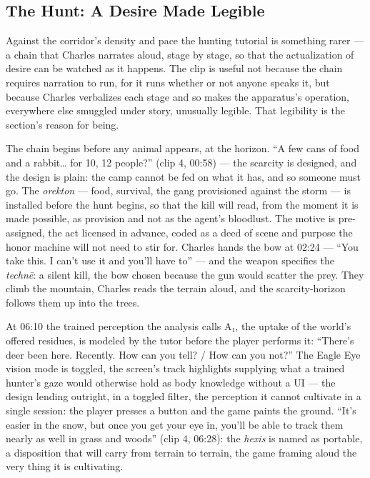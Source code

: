\documentclass{article}
\begin{document}
\bigskip

\subsection*{The Hunt: A Desire Made Legible}

Against the corridor's density and pace the hunting tutorial is something rarer — a chain that Charles narrates aloud, stage by stage, so that the actualization of desire can be watched as it happens. The clip is useful not because the chain requires narration to run, for it runs whether or not anyone speaks it, but because Charles verbalizes each stage and so makes the apparatus's operation, everywhere else smuggled under story, unusually legible. That legibility is the section's reason for being.

The chain begins before any animal appears, at the horizon. ``A few cans of food and a rabbit… for 10, 12 people?'' (clip 4, 00:58) — the scarcity is designed, and the design is plain: the camp cannot be fed on what it has, and so someone must go. The \textit{orekton} — food, survival, the gang provisioned against the storm — is installed before the hunt begins, so that the kill will read, from the moment it is made possible, as provision and not as the agent's bloodlust. The motive is pre-assigned, the act licensed in advance, coded as a deed of scene and purpose the honor machine will not need to stir for. Charles hands the bow at 02:24 — ``You take this. I can't use it and you'll have to'' — and the weapon specifies the \textit{technē}: a silent kill, the bow chosen because the gun would scatter the prey. They climb the mountain, Charles reads the terrain aloud, and the scarcity-horizon follows them up into the trees.

At 06:10 the trained perception the analysis calls A₁, the uptake of the world's offered residues, is modeled by the tutor before the player performs it: ``There's deer been here. Recently. How can you tell? / How can you not?'' The Eagle Eye vision mode is toggled, the screen's track highlights supplying what a trained hunter's gaze would otherwise hold as body knowledge without a UI — the design lending outright, in a toggled filter, the perception it cannot cultivate in a single session: the player presses a button and the game paints the ground. ``It's easier in the snow, but once you get your eye in, you'll be able to track them nearly as well in grass and woods'' (clip 4, 06:28): the \textit{hexis} is named as portable, a disposition that will carry from terrain to terrain, the game framing aloud the very thing it is cultivating.
\end{document}
